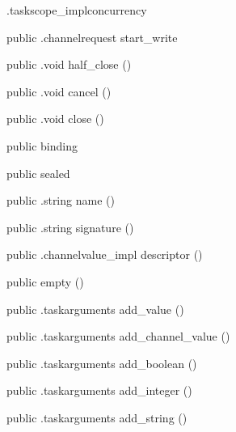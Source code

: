 \begin{CrexxClass}{.taskscope\_impl}{concurrency}
\begin{Members}
    \Method
      {public}
      {.channelrequest}
      {start\_write}
      {}

    \Method
      {public}
      {.void}
      {half\_close}
      {()}

    \Method
      {public}
      {.void}
      {cancel}
      {()}

    \Method
      {public}
      {.void}
      {close}
      {()}

    \Factory
      {public}
      {binding}
      {}

    \Factory
      {public}
      {sealed}
      {}

    \Method
      {public}
      {.string}
      {name}
      {()}

    \Method
      {public}
      {.string}
      {signature}
      {()}

    \Method
      {public}
      {.channelvalue\_impl}
      {descriptor}
      {()}

    \Factory
      {public}
      {empty}
      {()}

    \Method
      {public}
      {.taskarguments}
      {add\_value}
      {()}

    \Method
      {public}
      {.taskarguments}
      {add\_channel\_value}
      {()}

    \Method
      {public}
      {.taskarguments}
      {add\_boolean}
      {()}

    \Method
      {public}
      {.taskarguments}
      {add\_integer}
      {()}

    \Method
      {public}
      {.taskarguments}
      {add\_string}
      {()}


\end{Members}
\end{CrexxClass}
